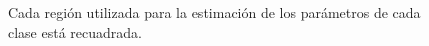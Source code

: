 \begin{figure}[H]\centering
   \captionsetup{labelformat=empty}

   \begin{minipage}{0.49\textwidth}
      \caption{Cada región utilizada para la estimación de los parámetros de cada clase está recuadrada.}
   \end{minipage}
   \begin{minipage}{0.49\textwidth}

\end{minipage}
\end{figure}
